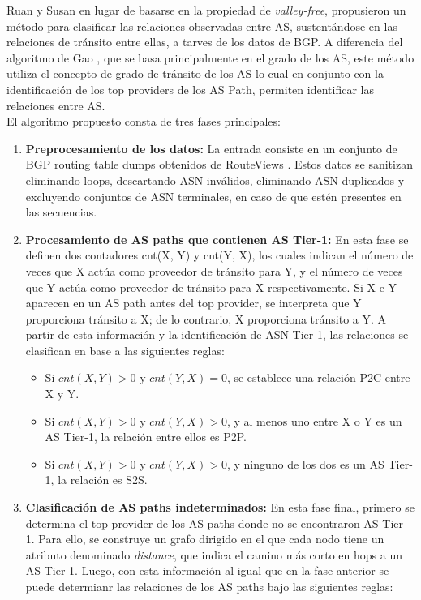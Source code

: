 Ruan y Susan en lugar de basarse en la propiedad de \textit{valley-free}, propusieron un método para clasificar las relaciones observadas entre AS, sustentándose en las relaciones de tránsito entre ellas, a tarves de los datos de BGP. A diferencia del algoritmo de Gao \cite{InferringASRelatioships2001}, que se basa principalmente en el grado de los AS, este método utiliza el concepto de grado de tránsito de los AS lo cual en conjunto con la identificación de los top providers de los AS Path, permiten identificar las relaciones entre AS.\\

El algoritmo propuesto consta de tres fases principales:
\begin{enumerate}
    \item \textbf{Preprocesamiento de los datos:} La entrada consiste en un conjunto de BGP routing table dumps obtenidos de RouteViews \cite{RouteViewsProject}. Estos datos se sanitizan eliminando loops, descartando ASN inválidos, eliminando ASN duplicados y excluyendo conjuntos de ASN terminales, en caso de que estén presentes en las secuencias.
    
    \item \textbf{Procesamiento de AS paths que contienen AS Tier-1:} 
    En esta fase se definen dos contadores cnt(X, Y) y cnt(Y, X), los cuales indican el número de veces que X actúa como proveedor de tránsito para Y, y el número de veces que Y actúa como proveedor de tránsito para X respectivamente. Si X e Y aparecen en un AS path antes del top provider, se interpreta que Y proporciona tránsito a X; de lo contrario, X proporciona tránsito a Y. A partir de esta información y la identificación de ASN Tier-1, las relaciones se clasifican en base a las siguientes reglas:


    \begin{itemize}
        \item Si $cnt(X, Y) > 0$ y $cnt(Y, X) = 0$, se establece una relación P2C entre X y Y.
        \item Si $cnt(X, Y) > 0$ y $cnt(Y, X) > 0$, y al menos uno entre X o Y es un AS Tier-1, la relación entre ellos es P2P.
        \item Si $cnt(X, Y) > 0$ y $cnt(Y, X) > 0$, y ninguno de los dos es un AS Tier-1, la relación es S2S.
    \end{itemize}


    \item \textbf{Clasificación de AS paths indeterminados:} En esta fase final, primero se determina el top provider de los AS paths donde no se encontraron AS Tier-1. Para ello, se construye un grafo dirigido en el que cada nodo tiene un atributo denominado \textit{distance}, que indica el camino  más corto en hops a un AS Tier-1. Luego, con esta información al igual que en la fase anterior se puede determianr las relaciones de los AS paths bajo las siguientes reglas:


\end{enumerate}
